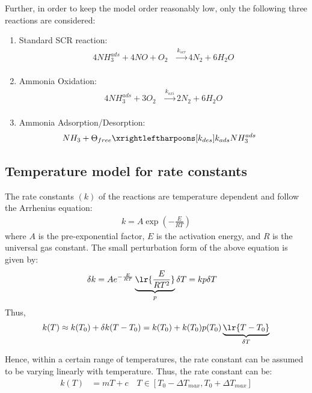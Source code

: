 Further, in order to keep the model order reasonably low, only the following three reactions are considered:
\begin{enumerate}
    \item Standard SCR reaction:
    \begin{align}
        4 NH_3 ^{ads} + 4 NO + O_2 &\xrightarrow[]{k_{scr}} 4 N_2 + 6 H_2O \label{eqn::std_scr}
    \end{align}
    \item Ammonia Oxidation:
    \begin{align}
        4 NH_3^{ads} + 3 O_2 &\xrightarrow[]{k_{oxi}} 2 N_2 + 6 H_2O \label{eqn::amox}
    \end{align}
    \item Ammonia Adsorption/Desorption:
        \begin{align}
            NH_3 + \Theta_{free} &\xrightleftharpoons[k_{des}]{k_{ads}} NH_3^{ads}
            \label{eqn::ads}
        \end{align}
\end{enumerate}


\subsection{Temperature model for rate constants}
The rate constants $(k)$ of the reactions are temperature dependent and follow the Arrhenius equation:
\begin{align*}
    k = A \exp\left(-\frac{E}{RT}\right)
\end{align*}
where $A$ is the pre-exponential factor, $E$ is the activation energy, and $R$ is the universal gas constant. The small
perturbation form of the above equation is given by:
\begin{align*}
    \delta k &= A e^{-\frac{E}{RT}} \underbrace{\lr{\frac{E}{RT^2}}}_p \delta T = k p \delta T
\end{align*}
Thus,
\begin{align*}
    k(T) \approx k(T_0) + \delta k(T - T_0) = k(T_0) + k(T_0) p(T_0) \underbrace{\lr{T - T_0}}_{\delta T}
\end{align*}

Hence, within a certain range of temperatures, the rate constant can be assumed to be varying linearly with temperature.
Thus, the rate constant can be:
\begin{align*}
    k(T) &= mT + c \quad T \in [T_0 - \Delta T_{max}, T_0 + \Delta T_{max}]
\end{align*}

